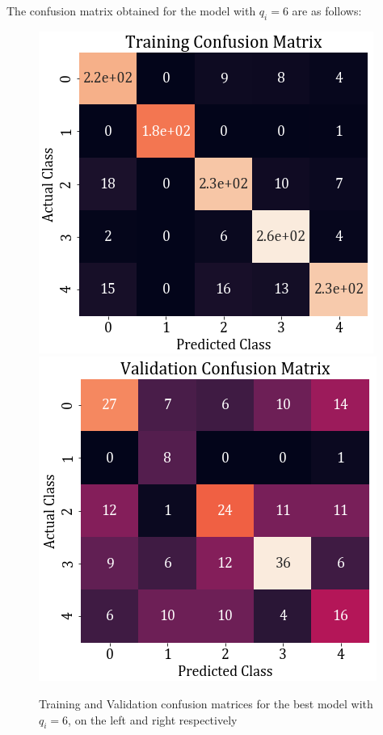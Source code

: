 \documentclass[11pt,a4paper]{article}
\newcommand{\noi}{\noindent}
\begin{document}
\noi
The confusion matrix obtained for the model with $q_i=6$ are as follows:
\begin{figure}[H]
    \centering
    \includegraphics[scale=0.5]{images/2A/2a_full_train_conf.png}
    \includegraphics[scale=0.5]{images/2A/2a_full_val_conf.png}
    \caption{Training and Validation confusion matrices for the best model with $q_i=6$, on the left and right respectively}
\end{figure}
\end{document}
